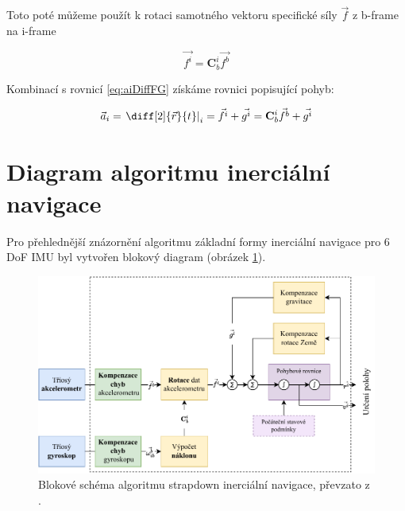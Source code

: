 Toto poté můžeme použít k rotaci samotného vektoru specifické síly $ \vec{f} $ z b-frame na i-frame

\begin{equation}
\vec{f^{i}} = \mathbf{C}_{b}^{i}\vec{f^{b}}
\end{equation}

Kombinací s rovnicí \ref{eq:aiDiffFG} získáme rovnici popisující pohyb:

\begin{equation}
\vec{a}_{i} = \left. \diff[2]{\vec{r}}{t} \right|_{i} = \vec{f^{i}} + \vec{g^{i}} = \mathbf{C}_{b}^{i}\vec{f^{b}} + \vec{g^{i}}
\end{equation}
\section{Diagram algoritmu inerciální navigace}
Pro přehlednější znázornění algoritmu základní formy inerciální navigace pro 6 \ac{DoF} \ac{IMU} byl vytvořen blokový diagram (obrázek \ref{StrapdownBlock}).

\begin{figure}[h]
    \centering
    \includegraphics[width=\textwidth]{obrazky/StrapdownBlock}
    \caption{Blokové schéma algoritmu strapdown inerciální navigace, převzato z \cite{Tittertonc2004} \cite{Grewal2013}. }
    \label{StrapdownBlock}
\end{figure}

